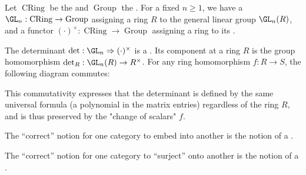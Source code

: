 \begin{example}
    Let $\operatorname{CRing}$ be the  and $\operatorname{Group}$ the . For a fixed $n \ge 1$, we have a  $\GL_n: \operatorname{CRing} \to \operatorname{Group}$ assigning a ring $R$ to the general linear group $\GL_n(R)$, and a functor $(\cdot)^\times: \operatorname{CRing} \to \operatorname{Group}$ assigning a ring to its . 
    
    The determinant $\det: \GL_n \Rightarrow (\cdot)^\times$ is a . Its component at a ring $R$ is the group homomorphism $\det_R: \GL_n(R) \to R^\times$. For any ring homomorphism $f: R \to S$, the following diagram commutes:
    \begin{center}
    \end{center}
    This commutativity expresses that the determinant is defined by the same universal formula (a polynomial in the matrix entries) regardless of the ring $R$, and is thus preserved by the "change of scalars" $f$.
\end{example}



The ``correct'' notion for one category to embed into another is the notion of a .





The ``correct'' notion for one category to ``surject'' onto another is the notion of a .



